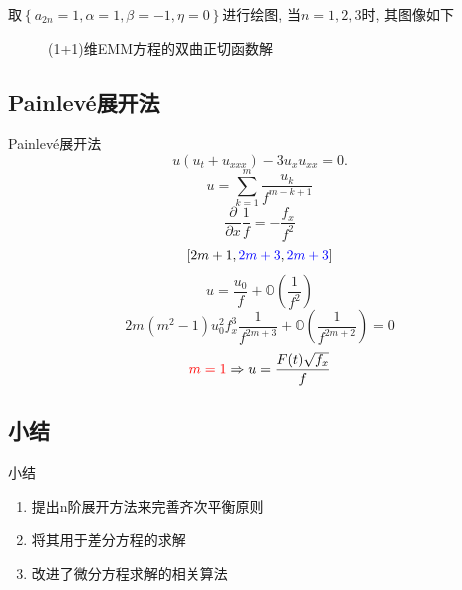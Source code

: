 \documentclass[handout]{beamer}
\newcommand{\mbrace}[1]{\left[#1\right]}
\newcommand{\bbrace}[1]{\left\{#1\right\}}
\newcommand{\OO}{\ensuremath{\mathbb O}}%
\newcommand{\DIF}[1]{\ensuremath{\frac{\partial}{\partial #1}}}
\newcommand{\Painleve}{Painlev{\'e}}
\newcommand{\red}[1]{{\color{red}#1}}
\newcommand{\blue}[1]{{\color{blue}#1}}
\begin{document}
\begin{frame}
取$\bbrace{a_{2n}=1,\alpha=1,\beta=-1,\eta=0}$进行绘图, 当$n=1,2,3$时, 其图像如下
\begin{figure}[ht]
\centering
{}
\caption{(1+1)维EMM方程的双曲正切函数解} 
\end{figure}
\end{frame}

\subsection{\Painleve{}展开法}
\begin{frame}{\Painleve{}展开法}
\[
  u(u_t+u_{xxx})-3u_x u_{xx}=0.
\]
\[
  u=\sum_{k=1}^{m}\frac{u_k}{f^{m-k+1}}
\]
\[
  \DIF{x}{\frac{1}{f}}=-\frac{f_x}{f^2}
\]
\[
  \mbrace{2m+1,\blue{2m+3},\blue{2m+3}}
\]
\[
  u=\frac{u_0}{f}+\OO(\frac{1}{f^2})
\]
\[
  2m(m^2-1)u_0^2f_x^3\frac{1}{f^{2m+3}}+\OO(\frac{1}{f^{2m+2}})=0
\]
\[
  \red{m=1}\Rightarrow u=\frac{F(t)\sqrt{f_x}}{f}
\]
\end{frame}

\subsection{小结}
\begin{frame}{小结}
\begin{enumerate}
\item 提出n阶展开方法来完善齐次平衡原则
\item 将其用于差分方程的求解
\item 改进了微分方程求解的相关算法 
\end{enumerate}
\end{frame}
\end{document}
